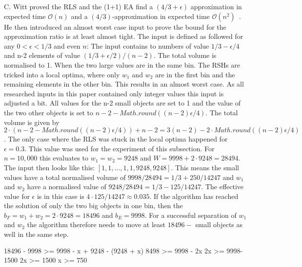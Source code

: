 C. Witt proved the RLS and the (1+1) EA find a $(4/3+\epsilon)$ approximation in expected time $\mathcal{O}(n)$ and a $(4/3)$-approximation in expected time $\mathcal{O}(n^2)$~\cite{diekert2005stacs}.
He then introduced an almost worst case input to prove the bound for the approximation ratio is at least almost tight.
The input is defined as followed for any $0<\epsilon<1/3$ and even $n$:
The input contains to numbers of value $1/3 - \epsilon/4$ and n-2 elements of value $(1/3+\epsilon/2)/(n-2)$. 
The total volume is normalised to 1.
When the two large values are in the same bin. The RSHs are tricked into a local optima, where only $w_1$ and $w_2$ are in the first bin and the remaining elements in the other bin.
This results in an almost worst case.
As all researched inputs in this paper contained only integer values this input is adjusted a bit.
All values for the n-2 small objects are set to 1 and the value of the two other objects is set to $n-2-Math.round((n - 2)\epsilon /4)$.
The total volume is given by $2\cdot(n-2-Math.round((n - 2)\epsilon /4))+n-2 = 3(n-2)-2\cdot Math.round((n - 2)\epsilon /4)$.
The only case where the RLS was stuck in the local optima happened for $\epsilon=0.3$.
This value was used for the experiment of this subsection.\newline
For $n=10,000$ this evaluates to $w_1=w_2=9248$ and $W=9998+2 \cdot 9248 = 28494$.
The input then looks like this: $[1, 1, \dots, 1, 1, 9248, 9248]$.
This means the small values have a total normalised volume of $9998/28494=1/3+250/14247$ and $w_1$ and $w_2$ have a normalised value of $9248/28494=1/3-125/14247$.
The effective value for $\epsilon$ is in this case is $4 \cdot 125/14247 \approx 0.035$.
If the algorithm has reached the solution of only the two big objects in one bin, then the $b_F = w_1+w_2=2\cdot 9248 = 18496$ and $b_E = 9998$. For a successful separation of $w_1$ and $w_2$ the algorithm therefore needs to move at least $18496-$ small objects as well in the same step.

18496 - 9998 >= 9998 - x + 9248 - (9248 + x)
8498 >= 9998 - 2x
2x >= 9998-1500
2x >= 1500
x >= 750
